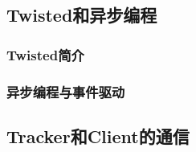 \documentclass[15pt]{ctexart}
\begin{document}
	\subsection{Twisted和异步编程} %
	\label{sub:twisted和异步编程}
		\subsubsection{Twisted简介} %
		\label{ssub:twisted简介}
		
		\subsubsection{异步编程与事件驱动} %
		\label{ssub:异步编程与事件驱动}
		

	\subsection{Tracker和Client的通信} %
	\label{sub:tracker_和_client}
\end{document}
